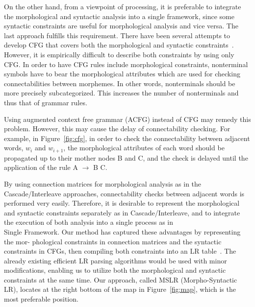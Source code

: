 On the other hand, from a viewpoint of processing, it is preferable to
integrate the morphological and syntactic analysis into a single
framework, since some syntactic constraints are useful for
morphological analysis and vice versa. The last approach fulfills this
requirement. There have been several attempts to develop CFG that
covers both the morphological and syntactic
constraints~\cite{kita:92:a,sano:92:a}. However, it is empirically
difficult to describe both constraints by using only CFG. In order to
have CFG rules include morphological constraints, nonterminal symbols
have to bear the morphological attributes which are used for checking
connectabilities between morphemes. In other words, nonterminals
should be more precisely subcategorized. This increases the number of
nonterminals and thus that of grammar rules.

\begin{center}
    
\end{center}

Using augmented context free grammar (ACFG) instead of CFG may remedy
this problem. However, this may cause the delay of connectability
checking. For example, in Figure~\ref{fig:cfg}, in order to check the
connectability between adjacent words, $w_{i}$ and $w_{i+1}$, the
morphological attributes of each word should be propagated up to their
mother nodes B and C, and the check is delayed until the application
of the rule A $\to$ B C. 

By using connection matrices for morphological analysis as in the
Cascade/Interleave approaches, connectability checks between adjacent
words is performed very easily. Therefore, it is desirable to
represent the morphological and syntactic constraints separately as in
Cascade/Interleave, \hspace{0.5mm}and \hspace{0.25mm}to \hspace{0.25mm}integrate \hspace{0.25mm}the \hspace{0.25mm}execution \hspace{0.25mm}of \hspace{0.25mm}both \hspace{0.4mm}analysis
\hspace{0.25mm}into \hspace{0.3mm}a \hspace{0.25mm}single \hspace{0.25mm}process as \hspace{0.25mm}in \\Single Framework. Our method has captured
these advantages by representing the mor- phological constraints in
connection matrices and the syntactic constraints in CFGs, then
compiling both constraints into an LR table~\cite{aho:86:a}. The
already existing efficient LR parsing algorithms would be used with
minor modifications, enabling us to utilize both the morphological and
syntactic constraints at the same time. Our approach, called MSLR
(Morpho-Syntactic LR), locates at the right bottom of the map in
Figure~\ref{fig:map}, which is the most preferable position.



